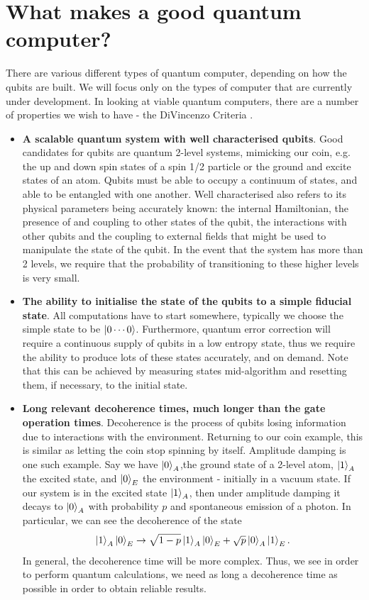 \documentclass{article}
\theoremstyle{definition}
\begin{document}
\section{What makes a good quantum computer?}
There are various different types of quantum computer, depending on how the qubits are built. We will focus only on the types of computer that are currently under development. In looking at viable quantum computers, there are a number of properties we wish to have - the DiVincenzo Criteria \cite{DiVincenzo_2000}.
\begin{itemize}
    \item \textbf{A scalable quantum system with well characterised qubits}. Good candidates for qubits are quantum 2-level systems, mimicking our coin, e.g. the up and down spin states of a spin 1/2 particle or the ground and excite states of an atom. Qubits must be able to occupy a continuum of states, and able to be entangled with one another. Well characterised also refers to its physical parameters being accurately known: the internal Hamiltonian, the presence of and coupling to other states of the qubit, the interactions with other qubits and the coupling to external fields that might be used to manipulate the state of the qubit. In the event that the system has more than 2 levels, we require that the probability of transitioning to these higher levels is very small.
    \item \textbf{The ability to initialise the state of the qubits to a simple fiducial state}. All computations have to start somewhere, typically we choose the simple state to be $\ket{0 \cdots 0}$. Furthermore, quantum error correction will require a continuous supply of qubits in a low entropy state, thus we require the ability to produce lots of these states accurately, and on demand. Note that this can be achieved by measuring states mid-algorithm and resetting them, if necessary, to the initial state.
    \item \textbf{Long relevant decoherence times, much longer than the gate operation times}. Decoherence is the process of qubits losing information due to interactions with the environment. Returning to our coin example, this is similar as letting the coin stop spinning by itself.  Amplitude damping is one such example. Say we have $\ket{0}_A$,the ground state of a 2-level atom, $\ket{1}_A$ the excited state, and $\ket{0}_E$ the environment - initially in a vacuum state. If our system is in the excited state $\ket{1}_A$, then under amplitude damping it decays to $\ket{0}_A$ with probability $p$ and spontaneous emission of a photon. In particular, we can see the decoherence of the state 
    \[
    \ket{1}_A \ket{0}_E \to \sqrt{1 - p} \ket{1}_A \ket{0}_E + \sqrt{p}\ket{0}_A\ket{1}_E.
    \]
    In general, the decoherence time will be more complex. Thus, we see in order to perform quantum calculations, we need as long a decoherence time as possible in order to obtain reliable results.
    

\end{itemize}
\end{document}
